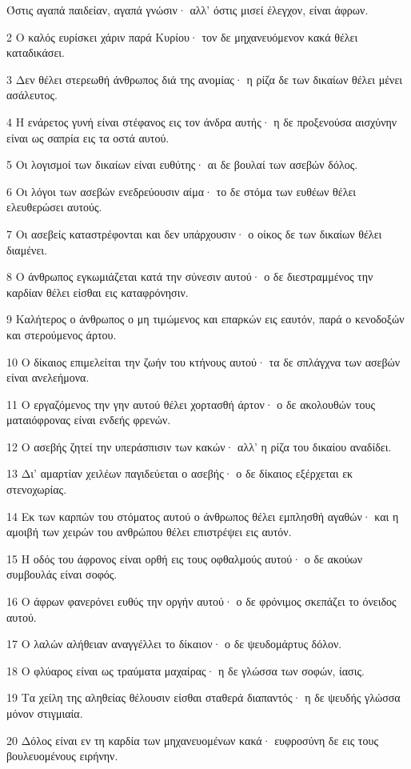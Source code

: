 \par Όστις αγαπά παιδείαν, αγαπά γνώσιν· αλλ' όστις μισεί έλεγχον, είναι άφρων.
\par 2 Ο καλός ευρίσκει χάριν παρά Κυρίου· τον δε μηχανευόμενον κακά θέλει καταδικάσει.
\par 3 Δεν θέλει στερεωθή άνθρωπος διά της ανομίας· η ρίζα δε των δικαίων θέλει μένει ασάλευτος.
\par 4 Η ενάρετος γυνή είναι στέφανος εις τον άνδρα αυτής· η δε προξενούσα αισχύνην είναι ως σαπρία εις τα οστά αυτού.
\par 5 Οι λογισμοί των δικαίων είναι ευθύτης· αι δε βουλαί των ασεβών δόλος.
\par 6 Οι λόγοι των ασεβών ενεδρεύουσιν αίμα· το δε στόμα των ευθέων θέλει ελευθερώσει αυτούς.
\par 7 Οι ασεβείς καταστρέφονται και δεν υπάρχουσιν· ο οίκος δε των δικαίων θέλει διαμένει.
\par 8 Ο άνθρωπος εγκωμιάζεται κατά την σύνεσιν αυτού· ο δε διεστραμμένος την καρδίαν θέλει είσθαι εις καταφρόνησιν.
\par 9 Καλήτερος ο άνθρωπος ο μη τιμώμενος και επαρκών εις εαυτόν, παρά ο κενοδοξών και στερούμενος άρτου.
\par 10 Ο δίκαιος επιμελείται την ζωήν του κτήνους αυτού· τα δε σπλάγχνα των ασεβών είναι ανελεήμονα.
\par 11 Ο εργαζόμενος την γην αυτού θέλει χορτασθή άρτον· ο δε ακολουθών τους ματαιόφρονας είναι ενδεής φρενών.
\par 12 Ο ασεβής ζητεί την υπεράσπισιν των κακών· αλλ' η ρίζα του δικαίου αναδίδει.
\par 13 Δι' αμαρτίαν χειλέων παγιδεύεται ο ασεβής· ο δε δίκαιος εξέρχεται εκ στενοχωρίας.
\par 14 Εκ των καρπών του στόματος αυτού ο άνθρωπος θέλει εμπλησθή αγαθών· και η αμοιβή των χειρών του ανθρώπου θέλει επιστρέψει εις αυτόν.
\par 15 Η οδός του άφρονος είναι ορθή εις τους οφθαλμούς αυτού· ο δε ακούων συμβουλάς είναι σοφός.
\par 16 Ο άφρων φανερόνει ευθύς την οργήν αυτού· ο δε φρόνιμος σκεπάζει το όνειδος αυτού.
\par 17 Ο λαλών αλήθειαν αναγγέλλει το δίκαιον· ο δε ψευδομάρτυς δόλον.
\par 18 Ο φλύαρος είναι ως τραύματα μαχαίρας· η δε γλώσσα των σοφών, ίασις.
\par 19 Τα χείλη της αληθείας θέλουσιν είσθαι σταθερά διαπαντός· η δε ψευδής γλώσσα μόνον στιγμιαία.
\par 20 Δόλος είναι εν τη καρδία των μηχανευομένων κακά· ευφροσύνη δε εις τους βουλευομένους ειρήνην.

